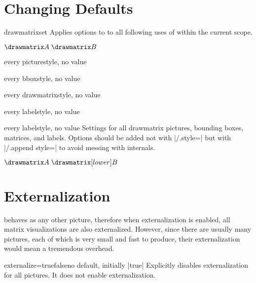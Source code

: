 \section{Changing Defaults}

\begin{docCommand}{drawmatrixset}{}
    Applies options to to all following uses of  within the current
    scope.
    \begin{dispExample}

       $\drawmatrix A \; \drawmatrix B$
    \end{dispExample}
\end{docCommand}

\begin{docDmKey}[][docmulti]{every picture}{}{style, no value}
\end{docDmKey}
\begin{docDmKey}[][docmulti]{every bbox}{}{style, no value}
\end{docDmKey}
\begin{docDmKey}[][docmulti]{every drawmatrix}{}{style, no value}
\end{docDmKey}
\begin{docDmKey}[][docmulti]{every label}{}{style, no value}
\end{docDmKey}
\begin{docDmKey}{every label}{}{style, no value}
    Settings for all drawmatrix pictures, bounding boxes, matrices, and labels.
    Options should be added not with |/.style=| but with |/.append style=| to
    avoid messing with internals.
    \begin{dispExample}

        $\drawmatrix A \; \drawmatrix[lower]B$
    \end{dispExample}
\end{docDmKey}


\section{Externalization}

 behaves as any other \TikZ picture, therefore when
externalization is enabled, all matrix visualizations are also externalized.
However, since there are usually many  pictures, each of
which is very small and fast to produce, their externalization would mean a
tremendous overhead.

\begin{docDmKey}{externalize}{=true\textbar false}{no default, initially |true|}
    Explicitly disables externalization for all  pictures. It
    does not enable externalization.
\end{docDmKey}
